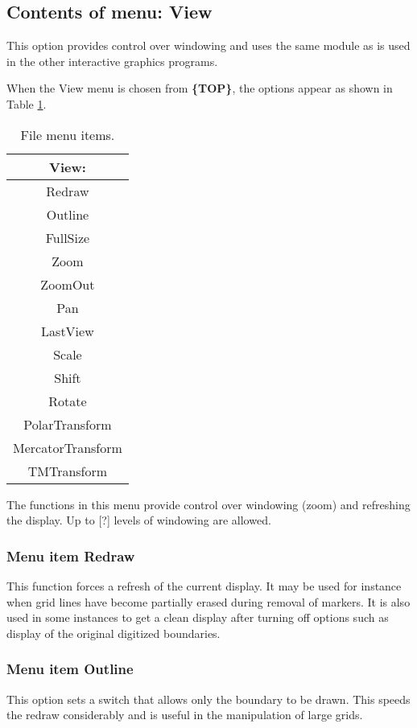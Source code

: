 \documentclass{article}
\begin{document}
\subsection{Contents of menu: View}
This option provides control over windowing and uses the same module as is used in the other interactive graphics programs.

When the View menu is chosen from \textbf{\{TOP\}}, the options appear as shown in Table \ref{tab:VIEW}.

\begin{table}[htb!]
 \caption{File menu items.}
  \begin{center}
   \begin{tabular}{|c|}
    \hline
View:\\     \hline
Redraw \\ Outline \\ FullSize \\ Zoom \\ ZoomOut \\ Pan \\ LastView \\ Scale \\ Shift \\ Rotate \\ PolarTransform \\ MercatorTransform \\ TMTransform \\
    \hline
   \end{tabular}
   \label{tab:VIEW}
  \end{center}
\end{table}


The functions in this menu provide control over windowing (zoom) and refreshing the display. Up to [?] levels of windowing are allowed.

\subsubsection{Menu item Redraw}
This function forces a refresh of the current display. It may be used for instance when grid lines have become partially erased during removal of markers. It is also used in some instances to get a clean display after turning off options such as display of the original digitized boundaries.

\subsubsection{Menu item Outline}
This option sets a switch that allows only the boundary to be drawn. This speeds the redraw considerably and is useful in the manipulation of large grids.
\end{document}
